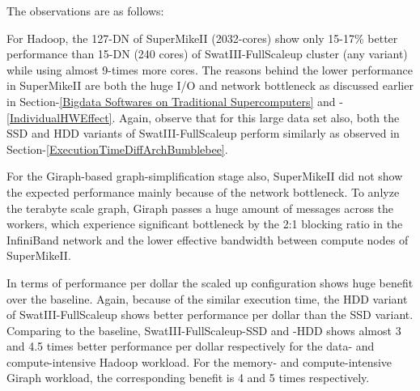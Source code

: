\documentclass[conference]{IEEEtran}
\begin{document}
The observations are as follows:
\begin{inparaenum}[\itshape 1\upshape)]
\item For Hadoop, the 127-DN of SuperMikeII (2032-cores) show only 15-17\% better performance than 15-DN (240 cores) of SwatIII-FullScaleup cluster (any variant) while using almost 9-times more cores.  
The reasons behind the lower performance in SuperMikeII are both the huge I/O and network bottleneck as discussed earlier in Section-\ref{Bigdata Softwares on Traditional Supercomputers} and -\ref{IndividualHWEffect}.
Again, observe that for this large data set also, both the SSD and HDD variants of SwatIII-FullScaleup perform similarly as observed in Section-\ref{ExecutionTimeDiffArchBumblebee}.
\item For the Giraph-based graph-simplification stage also, SuperMikeII did not show the expected performance mainly because of the network bottleneck.
To anlyze the terabyte scale graph, Giraph passes a huge amount of messages across the workers, which experience significant bottleneck by the 2:1 blocking ratio in the InfiniBand network and the lower effective bandwidth between compute nodes of SuperMikeII.  
\item In terms of performance per dollar the scaled up configuration shows huge benefit over the baseline. Again, because of the similar execution time, the HDD variant of SwatIII-FullScaleup shows better performance per dollar than the SSD variant. Comparing to the baseline, SwatIII-FullScaleup-SSD and -HDD shows almost 3 and 4.5 times better performance per dollar respectively for the data- and compute-intensive Hadoop workload. For the memory- and compute-intensive Giraph workload, the corresponding benefit is 4 and 5 times respectively.
\end{inparaenum}
\end{document}
